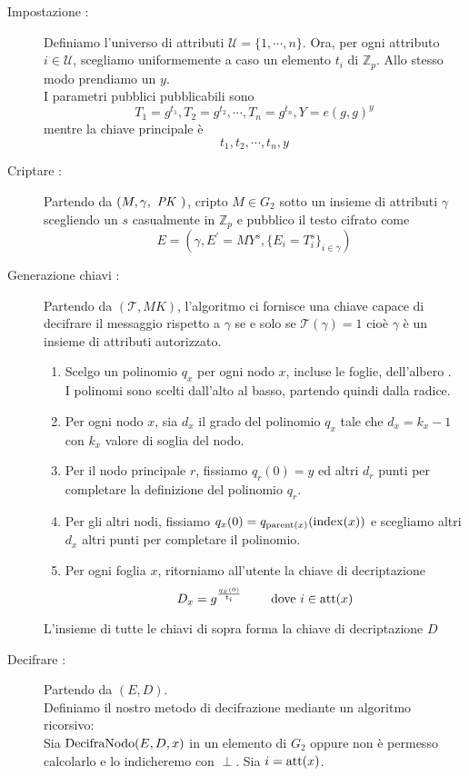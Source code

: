 \begin{description}
\item[Impostazione :]Definiamo l'universo di attributi $\mathcal{U} = \{1,\cdots,n\}$. Ora, per ogni attributo $i \in \mathcal{U}$, scegliamo uniformemente a caso un elemento $t_i$ di $\mathbb{Z}_p$. Allo stesso modo prendiamo un $y$.\\
I parametri pubblici \pk pubblicabili sono
\[ T_1 = g^{t_1} , T_2 = g^{t_2} , \cdots , T_n = g^{t_n} , Y = e(g,g)^y \]\label{pubchiavi}
mentre la chiave principale \mk è
\[ t_1 , t_2 , \cdots , t_n , y \]
\item[Criptare :] Partendo da $(M , \gamma, \text{ \textit{PK} })$, cripto $M \in G_2$ sotto un insieme di attributi $\gamma$ scegliendo un $s$ casualmente in $\mathbb{Z}_p$ e pubblico il testo cifrato come
\[ E = (\gamma , E^\prime = MY^s , \{E_i = T_i^s \}_{i\in\gamma}) \]
\item[Generazione chiavi :] Partendo da $( \mathcal{T} , MK )$, l'algoritmo ci fornisce una chiave capace di decifrare il messaggio rispetto a $\gamma$ se e solo se $\mathcal{T}(\gamma) = 1$ cioè $\gamma$ è un insieme di attributi autorizzato.
\begin{enumerate}
\item Scelgo un polinomio $q_x$ per ogni nodo $x$, incluse le foglie, dell'albero .\\
I polinomi sono scelti dall'alto al basso, partendo quindi dalla radice.
\item Per ogni nodo $x$, sia $d_x$ il grado del polinomio $q_x$ tale che $d_x = k_x - 1$ con $k_x$ valore di soglia del nodo.
\item Per il nodo principale $r$, fissiamo $q_r(0) = y$ ed altri $d_r$ punti per completare la definizione del polinomio $q_r$.
\item Per gli altri nodi, fissiamo $q_x(0) = q_{\operatorname{parent}(x)}(\operatorname{index}(x))$ e scegliamo altri $d_x$ altri punti per completare il polinomio.
\item Per ogni foglia $x$, ritorniamo all'utente la chiave di decriptazione
\[ D_x = g^{\frac{q_x(0)}{t_i}} \qquad \text{ dove } i \in \operatorname{att}(x) \]
\end{enumerate}
L'insieme di tutte le chiavi di sopra forma la chiave di decriptazione $D$
\item[Decifrare :] Partendo da $(E,D)$.\\
Definiamo il nostro metodo di decifrazione mediante un algoritmo ricorsivo:\\
Sia $\operatorname{DecifraNodo}( E , D , x )$ in un elemento di $G_2$ oppure non è permesso calcolarlo e lo indicheremo con $\perp$. Sia $i = \operatorname{att}(x)$.

\end{description}
